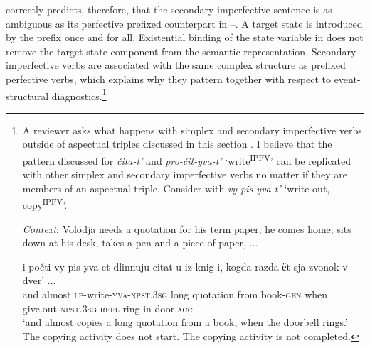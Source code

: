 \documentclass[output=paper,colorlinks,citecolor=brown]{langscibook}
\begin{document}
\noindent {} correctly predicts, therefore, that the secondary imperfective sentence is as ambiguous as its perfective prefixed counterpart in --. A target state is introduced by the prefix once and for all. Existential binding of the state variable in  does not remove the target state component from the semantic representation. Secondary imperfective verbs are associated with the same complex structure as prefixed perfective verbs, which explains why they pattern together with respect to event-structural diagnostics.\footnote{A reviewer asks what happens with simplex and secondary imperfective verbs outside of aspectual triples discussed in this section%
. I believe that the pattern discussed for \textit{čita-t’} and \textit{pro-čit-yva-t’} ‘write\textsuperscript{IPFV}’ can be replicated with other simplex and secondary imperfective verbs no matter if they are members of an aspectual triple. %
Consider  with \textit{vy-pis-yva-t’} ‘write out, copy\textsuperscript{IPFV}’.

\eanoraggedright \textit{Context}: Volodja needs a quotation for his term paper; he comes home, sits down at his desk, takes a pen and a piece of paper, ...\label{ex:tatevosov:vi}

\gll i  počti vy-pis-yva-et  dlinnuju  citat-u   iz knig-i,  kogda  razda-{ёt-sja}  zvonok  v  dver' ...\\      
and  almost  \textsc{lp}-write-\textsc{yva-npst.3sg}  long  quotation  from      book-\textsc{gen}  when  give.out-\textsc{npst.3sg-refl}   ring  in  door.\textsc{acc}\\
\glt ‘and almost copies a long quotation from a book, when the doorbell rings.’  
\ea The copying activity does not start.  
\ex The copying activity is not completed. 
\z
\z 

}
\end{document}
